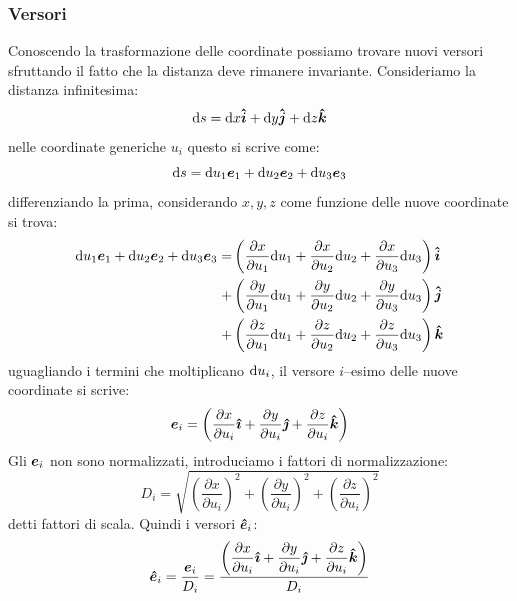\subsubsection{Versori}
Conoscendo la trasformazione delle coordinate possiamo trovare nuovi versori sfruttando il fatto che la distanza deve rimanere invariante. Consideriamo la distanza infinitesima:
\begin{equation}
  \mathrm{d} s = \mathrm{d} x\boldsymbol{\hat {i}} + \mathrm{d} y\boldsymbol{\hat {j}} + \mathrm{d} z\boldsymbol{\hat {k}}
\end{equation}
nelle coordinate generiche $u_i$ questo si scrive come:
\begin{equation}
  \mathrm{d} s = \mathrm{d} u_1\boldsymbol{e}_1 + \mathrm{d} u_2\boldsymbol{e}_2 + \mathrm{d} u_3\boldsymbol{e}_3
\end{equation}
differenziando la prima, considerando $x,y,z$ come funzione delle nuove coordinate si trova:
\begin{equation}
  \begin{aligned}
    \mathrm{d} u_1\boldsymbol{e}_1 + \mathrm{d} u_2\boldsymbol{e}_2 + \mathrm{d} u_3\boldsymbol{e}_3 = & \left(\frac{\partial x}{\partial u_1}\mathrm{d} u_1 + \frac{\partial x}{\partial u_2}\mathrm{d} u_2 +  \frac{\partial x}{\partial u_3}\mathrm{d} u_3\right)\boldsymbol{\hat {i}} \\
    +                                                  & \left(\frac{\partial y}{\partial u_1}\mathrm{d} u_1 + \frac{\partial y}{\partial u_2}\mathrm{d} u_2 +  \frac{\partial y}{\partial u_3}\mathrm{d} u_3\right)\boldsymbol{\hat {j}} \\
    +                                                  & \left(\frac{\partial z}{\partial u_1}\mathrm{d} u_1 + \frac{\partial z}{\partial u_2}\mathrm{d} u_2 +  \frac{\partial z}{\partial u_3}\mathrm{d} u_3\right)\boldsymbol{\hat {k}}
  \end{aligned}
\end{equation}
uguagliando i termini che moltiplicano $\mathrm{d} u_i$, il versore $i$--esimo delle nuove coordinate si scrive:
\[\boldsymbol{e}_i=\left(\dfrac{\partial x}{\partial u_i}\boldsymbol{\hat {\imath}}+\dfrac{\partial y}{\partial u_i}\boldsymbol{\hat {\jmath}}+\dfrac{\partial z}{\partial u_i}\boldsymbol{\hat {k}}\right)\]
Gli $\boldsymbol{e}_i$ non sono normalizzati, introduciamo i fattori di normalizzazione:
\[D_i=\sqrt{\left(\frac{\partial x}{\partial u_i}\right)^2+\left(\frac{\partial y}{\partial u_i}\right)^2+\left(\frac{\partial z}{\partial u_i}\right)^2}\]
detti  fattori di scala. Quindi i versori $\boldsymbol{\hat {e}}_i$:
\begin{equation}
  \boldsymbol{\hat {e}}_i = \frac{\boldsymbol{e}_i}{D_i} = \dfrac{\left(\dfrac{\partial x}{\partial u_i}\boldsymbol{\hat {\imath}}+\dfrac{\partial y}{\partial u_i}\boldsymbol{\hat {\jmath}}+\dfrac{\partial z}{\partial u_i}\boldsymbol{\hat {k}}\right)}{D_i}
\end{equation}
